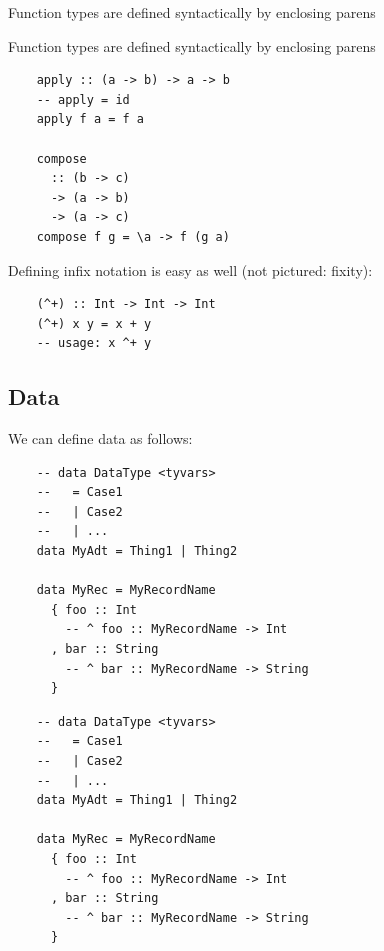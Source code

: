 \documentclass[tikz]{beamer}
\theoremstyle{definition}
\begin{document}
\begin{frame}[fragile]
	Function types are defined syntactically by enclosing parens 
\end{frame}

\begin{frame}[fragile]
	Function types are defined syntactically by enclosing parens 

\begin{center}
	\begin{verbatim}
	apply :: (a -> b) -> a -> b
	-- apply = id
	apply f a = f a
	
	compose 
	  :: (b -> c)
	  -> (a -> b)
	  -> (a -> c)
	compose f g = \a -> f (g a)
	\end{verbatim}
	\end{center}
\end{frame}

\begin{frame}[fragile]
Defining infix notation is easy as well (not pictured: fixity): 

\begin{center}
	\begin{verbatim}
	(^+) :: Int -> Int -> Int
	(^+) x y = x + y
	-- usage: x ^+ y
	\end{verbatim}
\end{center}
\end{frame}

\subsection{Data}
\begin{frame}[fragile]

We can define data as follows: 

\begin{center}
	\begin{verbatim}
	-- data DataType <tyvars>
	--   = Case1 
	--   | Case2
	--   | ...
	data MyAdt = Thing1 | Thing2 
	
	data MyRec = MyRecordName
	  { foo :: Int 
	    -- ^ foo :: MyRecordName -> Int
	  , bar :: String
	    -- ^ bar :: MyRecordName -> String
	  }	  	  
	\end{verbatim}
\end{center}

\end{frame}

\begin{frame}[fragile]
\begin{center}
	\begin{verbatim}
	-- data DataType <tyvars>
	--   = Case1 
	--   | Case2
	--   | ...
	data MyAdt = Thing1 | Thing2 
	
	data MyRec = MyRecordName
	  { foo :: Int 
	    -- ^ foo :: MyRecordName -> Int
	  , bar :: String
	    -- ^ bar :: MyRecordName -> String
	  }  
	\end{verbatim}
\end{center}
\end{frame}
\end{document}
